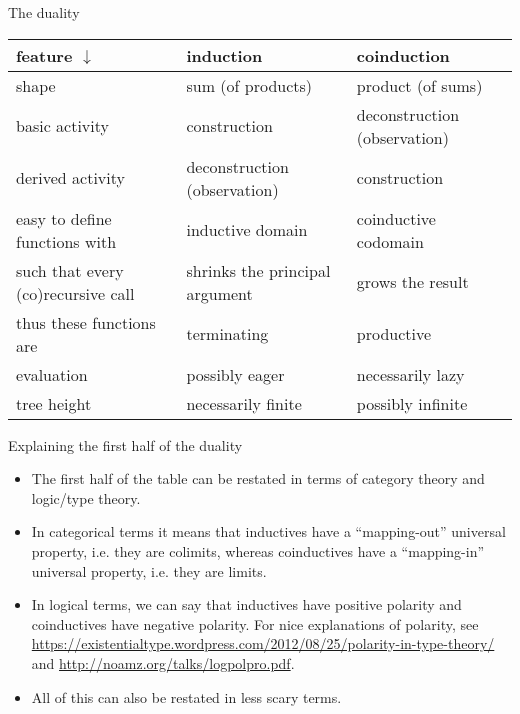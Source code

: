 \documentclass{beamer}
\begin{document}
\begin{frame}{The duality}
\begin{tabular}{ | p{3cm} | p{3cm} | p{3cm} | }
	\hline
	feature $\downarrow$ & induction & coinduction \\\hline
	shape & sum (of products) & product (of sums) \\\hline
	basic activity & construction & deconstruction (observation) \\\hline
	derived activity & deconstruction (observation) & construction \\\hline
	easy to define functions with & inductive domain & coinductive codomain \\\hline
	such that every (co)recursive call & shrinks the principal argument & grows the result \\\hline
	thus these functions are & terminating & productive \\\hline
	evaluation & possibly eager & necessarily lazy \\\hline
	tree height & necessarily finite & possibly infinite \\\hline
\end{tabular}
\end{frame}

\begin{frame}{Explaining the first half of the duality}
\begin{itemize}
	\item The first half of the table can be restated in terms of category theory and logic/type theory.
	\item In categorical terms it means that inductives have a ``mapping-out'' universal property, i.e. they are colimits, whereas coinductives have a ``mapping-in'' universal property, i.e. they are limits.
	\item In logical terms, we can say that inductives have positive polarity and coinductives have negative polarity. For nice explanations of polarity, see \url{https://existentialtype.wordpress.com/2012/08/25/polarity-in-type-theory/} and \url{http://noamz.org/talks/logpolpro.pdf}.
	\item All of this can also be restated in less scary terms.
\end{itemize}
\end{frame}
\end{document}
